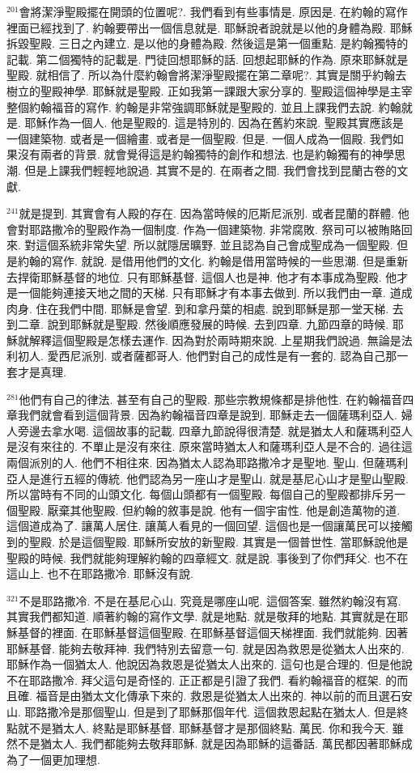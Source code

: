 \documentclass{book}
\begin{document}
$^{201}$會將潔淨聖殿擺在開頭的位置呢?.
我們看到有些事情是.
原因是.
在約翰的寫作裡面已經找到了.
約翰要帶出一個信息就是.
耶穌說者說就是以他的身體為殿.
耶穌拆毀聖殿.
三日之內建立.
是以他的身體為殿.
然後這是第一個重點.
是約翰獨特的記載.
第二個獨特的記載是.
門徒回想耶穌的話.
回想起耶穌的作為.
原來耶穌就是聖殿.
就相信了.
所以為什麼約翰會將潔淨聖殿擺在第二章呢?.
其實是關乎約翰去樹立的聖殿神學.
耶穌就是聖殿.
正如我第一課跟大家分享的.
聖殿這個神學是主宰整個約翰福音的寫作.
約翰是非常強調耶穌就是聖殿的.
並且上課我們去說.
約翰就是.
耶穌作為一個人.
他是聖殿的.
這是特別的.
因為在舊約來說.
聖殿其實應該是一個建築物.
或者是一個繪畫.
或者是一個聖殿.
但是.
一個人成為一個殿.
我們如果沒有兩者的背景.
就會覺得這是約翰獨特的創作和想法.
也是約翰獨有的神學思潮.
但是上課我們輕輕地說過.
其實不是的.
在兩者之間.
我們會找到昆蘭古卷的文獻.

$^{241}$就是提到.
其實會有人殿的存在.
因為當時候的厄斯尼派別.
或者昆蘭的群體.
他會對耶路撒冷的聖殿作為一個制度.
作為一個建築物.
非常腐敗.
祭司可以被賄賂回來.
對這個系統非常失望.
所以就隱居曠野.
並且認為自己會成聖成為一個聖殿.
但是約翰的寫作.
就說.
是借用他們的文化.
約翰是借用當時候的一些思潮.
但是重新去捍衛耶穌基督的地位.
只有耶穌基督.
這個人也是神.
他才有本事成為聖殿.
他才是一個能夠連接天地之間的天梯.
只有耶穌才有本事去做到.
所以我們由一章.
道成肉身.
住在我們中間.
耶穌是會望.
到和拿丹葉的相處.
說到耶穌是那一堂天梯.
去到二章.
說到耶穌就是聖殿.
然後順應發展的時候.
去到四章.
九節四章的時候.
耶穌就解釋這個聖殿是怎樣去運作.
因為對於兩時期來說.
上星期我們說過.
無論是法利初人.
愛西尼派別.
或者薩都哥人.
他們對自己的成性是有一套的.
認為自己那一套才是真理.

$^{281}$他們有自己的律法.
甚至有自己的聖殿.
那些宗教規條都是排他性.
在約翰福音四章我們就會看到這個背景.
因為約翰福音四章是說到.
耶穌走去一個薩瑪利亞人.
婦人旁邊去拿水喝.
這個故事的記載.
四章九節說得很清楚.
就是猶太人和薩瑪利亞人是沒有來往的.
不單止是沒有來往.
原來當時猶太人和薩瑪利亞人是不合的.
過往這兩個派別的人.
他們不相往來.
因為猶太人認為耶路撒冷才是聖地.
聖山.
但薩瑪利亞人是進行五經的傳統.
他們認為另一座山才是聖山.
就是基尼心山才是聖山聖殿.
所以當時有不同的山頭文化.
每個山頭都有一個聖殿.
每個自己的聖殿都排斥另一個聖殿.
厭棄其他聖殿.
但約翰的敘事是說.
他有一個宇宙性.
他是創造萬物的道.
這個道成為了.
讓萬人居住.
讓萬人看見的一個回望.
這個也是一個讓萬民可以接觸到的聖殿.
於是這個聖殿.
耶穌所安放的新聖殿.
其實是一個普世性.
當耶穌說他是聖殿的時候.
我們就能夠理解約翰的四章經文.
就是說.
事後到了你們拜父.
也不在這山上.
也不在耶路撒冷.
耶穌沒有說.

$^{321}$不是耶路撒冷.
不是在基尼心山.
究竟是哪座山呢.
這個答案.
雖然約翰沒有寫.
其實我們都知道.
順著約翰的寫作文學.
就是地點.
就是敬拜的地點.
其實就是在耶穌基督的裡面.
在耶穌基督這個聖殿.
在耶穌基督這個天梯裡面.
我們就能夠.
因著耶穌基督.
能夠去敬拜神.
我們特別去留意一句.
就是因為救恩是從猶太人出來的.
耶穌作為一個猶太人.
他說因為救恩是從猶太人出來的.
這句也是合理的.
但是他說不在耶路撒冷.
拜父這句是奇怪的.
正正都是引證了我們.
看約翰福音的框架.
的而且確.
福音是由猶太文化傳承下來的.
救恩是從猶太人出來的.
神以前的而且選石安山.
耶路撒冷是那個聖山.
但是到了耶穌那個年代.
這個救恩起點在猶太人.
但是終點就不是猶太人.
終點是耶穌基督.
耶穌基督才是那個終點.
萬民.
你和我今天.
雖然不是猶太人.
我們都能夠去敬拜耶穌.
就是因為耶穌的這番話.
萬民都因著耶穌成為了一個更加理想.
\end{document}
